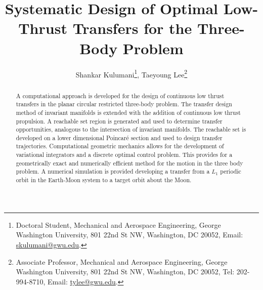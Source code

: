 \documentclass[letterpaper, preprint, paper,11pt]{AAS}	%
\begin{document}
\title{Systematic Design of Optimal Low-Thrust Transfers for the Three-Body Problem}

\author{Shankar Kulumani\thanks{Doctoral Student, Mechanical and Aerospace Engineering, George Washington University, 801 22nd St NW, Washington, DC 20052, Email: \href{mailto:skulumani@gwu.edu}{skulumani@gwu.edu}.},  
Taeyoung Lee\thanks{Associate Professor, Mechanical and Aerospace Engineering, George Washington University, 801 22nd St NW, Washington, DC 20052, Tel: 202-994-8710, Email: \href{mailto:tylee@gwu.edu}{tylee@gwu.edu}.}
}


\maketitle{} 		


\begin{abstract}
A computational approach is developed for the design of continuous low thrust transfers in the planar circular restricted three-body problem.
The transfer design method of invariant manifolds is extended with the addition of continuous low thrust propulsion.
A reachable set region is generated and used to determine transfer opportunities, analogous to the intersection of invariant manifolds.
The reachable set is developed on a lower dimensional Poincar\'e section and used to design transfer trajectories. 
Computational geometric mechanics allows for the development of variational integrators and a discrete optimal control problem.
This provides for a geometrically exact and numerically efficient method for the motion in the three body problem.
A numerical simulation is provided developing a transfer from a \( L_1 \) periodic orbit in  the Earth-Moon system to a target orbit about the Moon.
\end{abstract}
\end{document}
